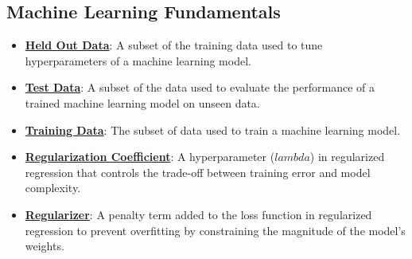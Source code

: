 \documentclass{article}%
\begin{document}
\subsection{Machine Learning Fundamentals}%
\label{subsec:MachineLearningFundamentals}%
\begin{itemize}[leftmargin=*]%
\item \href{https://purdue.brightspace.com/d2l/common/assets/pdfjs-d2l-dist/1.0.14-legacy/web/viewer.html?file=\%2Fcontent\%2Fenforced\%2F1095467-wl.202510.CS.24300.001\%2F10L1-CrossValidation.pdf\%3Fou\%3D1095467\&lang=en-us\&container=d2l-fileviewer-rendered-pdf\&fullscreen=d2l-fileviewer-rendered-pdf-dialog\&height=667#page=6}{\textbf{Held Out Data}}: A subset of the training data used to tune hyperparameters of a machine learning model.%
\item \href{https://purdue.brightspace.com/d2l/common/assets/pdfjs-d2l-dist/1.0.14-legacy/web/viewer.html?file=\%2Fcontent\%2Fenforced\%2F1095467-wl.202510.CS.24300.001\%2F10L1-CrossValidation.pdf\%3Fou\%3D1095467\&lang=en-us\&container=d2l-fileviewer-rendered-pdf\&fullscreen=d2l-fileviewer-rendered-pdf-dialog\&height=667#page=6}{\textbf{Test Data}}: A subset of the data used to evaluate the performance of a trained machine learning model on unseen data.%
\item \href{https://purdue.brightspace.com/d2l/common/assets/pdfjs-d2l-dist/1.0.14-legacy/web/viewer.html?file=\%2Fcontent\%2Fenforced\%2F1095467-wl.202510.CS.24300.001\%2F10L1-CrossValidation.pdf\%3Fou\%3D1095467\&lang=en-us\&container=d2l-fileviewer-rendered-pdf\&fullscreen=d2l-fileviewer-rendered-pdf-dialog\&height=667#page=6}{\textbf{Training Data}}: The subset of data used to train a machine learning model.%
\item \href{https://purdue.brightspace.com/d2l/common/assets/pdfjs-d2l-dist/1.0.14-legacy/web/viewer.html?file=\%2Fcontent\%2Fenforced\%2F1095467-wl.202510.CS.24300.001\%2F10L1-CrossValidation.pdf\%3Fou\%3D1095467\&lang=en-us\&container=d2l-fileviewer-rendered-pdf\&fullscreen=d2l-fileviewer-rendered-pdf-dialog\&height=667#page=17}{\textbf{Regularization Coefficient}}: A hyperparameter ($lambda$) in regularized regression that controls the trade-off between training error and model complexity.%
\item \href{https://purdue.brightspace.com/d2l/common/assets/pdfjs-d2l-dist/1.0.14-legacy/web/viewer.html?file=\%2Fcontent\%2Fenforced\%2F1095467-wl.202510.CS.24300.001\%2F10L1-CrossValidation.pdf\%3Fou\%3D1095467\&lang=en-us\&container=d2l-fileviewer-rendered-pdf\&fullscreen=d2l-fileviewer-rendered-pdf-dialog\&height=667#page=17}{\textbf{Regularizer}}: A penalty term added to the loss function in regularized regression to prevent overfitting by constraining the magnitude of the model's weights.%

\end{itemize}
\end{document}
